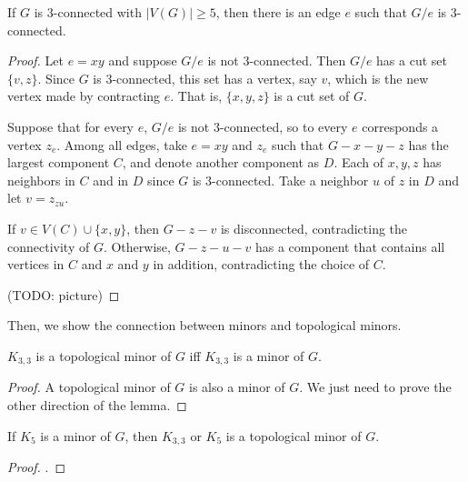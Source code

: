         \begin{thm} \label{thm_3conn}
            If $G$ is 3-connected with $|V(G)| \geq 5$, then there is an edge $e$ such that $G/e$ is 3-connected.
        \end{thm}
        
        \begin{proof}
            Let $e=xy$ and suppose $G/e$ is not 3-connected. Then $G/e$ has a cut set $\{v, z\}$. Since $G$ is 3-connected, this set has a vertex, say $v$, which is the new vertex made by contracting $e$. That is, $\{x, y, z\}$ is a cut set of $G$.
            
            Suppose that for every $e$, $G/e$ is not 3-connected, so to every $e$ corresponds a vertex $z_e$. Among all edges, take $e=xy$ and $z_e$ such that $G-x-y-z$ has the largest component $C$, and denote another component as $D$. Each of $x,y,z$ has neighbors in $C$ and in $D$ since $G$ is 3-connected. Take a neighbor $u$ of $z$ in $D$ and let $v=z_{zu}$.
            
            If $v \in V(C) \cup \{x,y\}$, then $G-z-v$ is disconnected, contradicting the connectivity of $G$. Otherwise, $G-z-u-v$ has a component that contains all vertices in $C$ and $x$ and $y$ in addition, contradicting the choice of $C$.
            
            (TODO: picture)
        \end{proof}
        
        Then, we show the connection between minors and topological minors.
        
        \begin{lemma} \label{lem_minor_K33}
            $K_{3,3}$ is a topological minor of $G$ iff $K_{3,3}$ is a minor of $G$.
        \end{lemma}
        
        \begin{proof}
            A topological minor of $G$ is also a minor of $G$. We just need to prove the other direction of the lemma.
            
            
        \end{proof}
        
        \begin{lemma} \label{lem_minor_K5}
            If $K_5$ is a minor of $G$, then $K_{3,3}$ or $K_5$ is a topological minor of $G$.
        \end{lemma}
        
        \begin{proof}
            .
        \end{proof}
    
